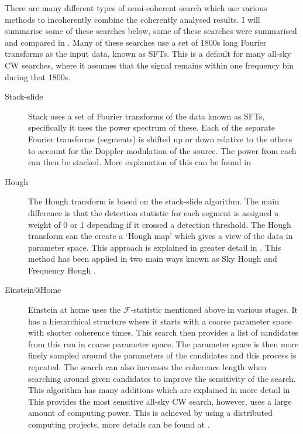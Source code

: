 There are many different types of semi-coherent search which use various methods to incoherently combine the coherently analysed results. 
I will summarise some of these searches below, some of these searches were summarised and compared in \citep{walsh2016ComparisonMethods}.
Many of these searches use a set of 1800s long Fourier transforms as the input data, known as \acp{SFT}. This is a default for many all-sky \ac{CW} searches, where it assumes that the signal remains within one frequency bin during that 1800s.

\begin{description}
	
	\item[Stack-slide] Stack uses a set of Fourier transforms of the data known as \acp{SFT}, specifically it uses the power spectrum of these. Each of the separate Fourier transforms (segments) is shifted up or down relative to the others to account for the Doppler modulation of the source. The power from each can then be stacked. More explanation of this can be found in \citep{brady2000SearchingPeriodic, cutler2005ImprovedStackslide}  
	
	\item[Hough] The Hough transform is based on the stack-slide algorithm. The main difference is that the detection statistic for each segment is assigned a weight of 0 or 1 depending if it crossed a detection threshold. The Hough transform can the create a `Hough map' which gives a view of the data in parameter space. This approach is explained in greater detail in \citep{krishnan2004HoughTransform,antonucci2008DetectionPeriodic}. 
	This method has been applied in two main ways known as Sky Hough \citep{krishnan2004HoughTransform}and Frequency Hough \citep{antonucci2008DetectionPeriodic,astone2014MethodAllsky}.
	
	\item[Einstein@Home] Einstein at home uses the $\mathcal{F}$-statistic mentioned above in various stages. It has a hierarchical structure where it starts with a coarse parameter space with shorter coherence times. This search then provides a list of candidates from this run in coarse parameter space. The parameter space is then more finely sampled around the parameters of the candidates and this process is repeated. The search can also increases the coherence length when searching around given candidates to improve the sensitivity of the search. This algorithm has many additions which are explained in more detail in \citep{singh2016ResultsAllsky,papa2016HierarchicalFollowup,walsh2016ComparisonMethods}
	This provides the most sensitive all-sky \ac{CW} search, however, uses a large amount of computing power. This is achieved by using a distributed computing projects, more details can be found at \citep{EinsteinHome}. 
	

\end{description}
